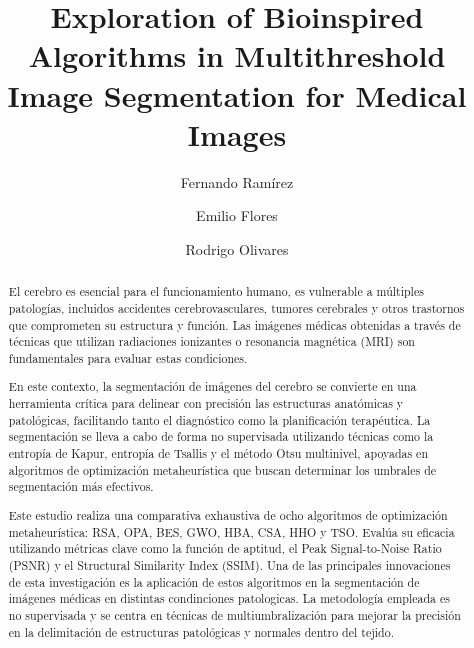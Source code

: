 \documentclass{elsarticle}
\def\corref#1{}%
\begin{document}
\begin{frontmatter}

\title{Exploration of Bioinspired Algorithms in Multithreshold Image Segmentation for Medical Images}





\author{Fernando Ramírez\corref{cor}}

\author{Emilio Flores}

\author{Rodrigo Olivares}

\address{Escuela de Ingenier\'ia Inform\'atica, Universidad de Valpara\'iso, Valpara\'iso, Chile.}

\begin{abstract}
\noindent El cerebro es esencial para el funcionamiento humano, es vulnerable a múltiples patologías, incluidos accidentes cerebrovasculares, tumores cerebrales y otros trastornos que comprometen su estructura y función. Las imágenes médicas obtenidas a través de técnicas que utilizan radiaciones ionizantes o resonancia magnética (MRI) son fundamentales para evaluar estas condiciones.

\noindent En este contexto, la segmentación de imágenes del cerebro se convierte en una herramienta crítica para delinear con precisión las estructuras anatómicas y patológicas, facilitando tanto el diagnóstico como la planificación terapéutica. La segmentación se lleva a cabo de forma no supervisada utilizando técnicas como la entropía de Kapur, entropía de Tsallis y el método Otsu multinivel, apoyadas en algoritmos de optimización metaheurística que buscan determinar los umbrales de segmentación más efectivos.

\noindent Este estudio realiza una comparativa exhaustiva de ocho algoritmos de optimización metaheurística: RSA, OPA, BES, GWO, HBA, CSA, HHO y TSO. Evalúa su eficacia utilizando métricas clave como la función de aptitud, el Peak Signal-to-Noise Ratio (PSNR) y el Structural Similarity Index (SSIM). Una de las principales innovaciones de esta investigación es la aplicación de estos algoritmos en la segmentación de imágenes médicas en distintas condinciones patologicas. La metodología empleada es no supervisada y se centra en técnicas de multiumbralización para mejorar la precisión en la delimitación de estructuras patológicas y normales dentro del tejido.


\end{abstract}
\end{frontmatter}
\end{document}
